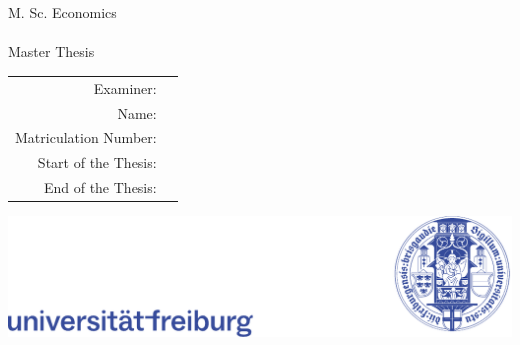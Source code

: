 \begin{titlepage}

	\thispagestyle{empty}
	\renewcommand{\baselinestretch}{1.5}    %
    
	\begingroup
		\myfont    %
		{
			\centering
			\ifPDFTeX
				{\fontsize{16}{12}} \\[7pt]
			\else
				{\fontsize{16}{12}} \\[7pt]
			\fi
			
			{\fontsize{16}{12}\selectfont M. Sc. Economics} \\[146pt]
			
			{\fontsize{20}{12}\selectfont \TopicTxt} \\[90pt]
			
			{\fontsize{14}{12}\selectfont Master Thesis} \\[16pt]
		}
		
		\hspace{1.48cm} \begin{tabular}{r l}
			{\fontsize{14}{12}\selectfont Examiner:} & {\fontsize{14}{12}\selectfont \ExaminerTxt} \\[10.5pt]
			{\fontsize{14}{12}\selectfont Name:} & {\fontsize{14}{12}\selectfont \StuNameTxt} \\[10.5pt]
			{\fontsize{14}{12}\selectfont Matriculation Number:} & {\fontsize{14}{12}\selectfont \StuNoTxt} \\[10.5pt]
			{\fontsize{14}{12}\selectfont Start of the Thesis:} & {\fontsize{14}{12}\selectfont \StartTxt} \\[10.5pt]
			{\fontsize{14}{12}\selectfont End of the Thesis:} & {\fontsize{14}{12}\selectfont \EndTxt} \\
		\end{tabular}
		
	\endgroup
	
	\vfill
	
	{\flushleft \includegraphics[width = 17.8cm]{Graphics/UniFreiburgLogos/New_Combo.pdf}}
	
	\thispagestyle{empty}
	 
\end{titlepage}



\restoregeometry    %
